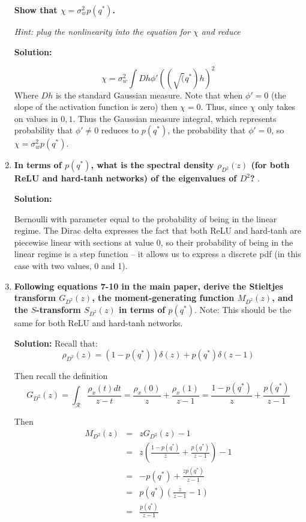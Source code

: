 \documentclass[a4paper]{article}
\begin{document}
\begin{enumerate}[label=(\alph*)]
\textbf{Show that $\chi = \sigma_w^2 p(q^*)$.}

\textit{Hint: plug the nonlinearity into the equation for $\chi$ and reduce}

\begin{tcolorbox}
\textbf{Solution:}

$$\chi = \sigma_w^2 \int D h \phi ' ((\sqrt(q^*)h)^2$$
Where $D h$ is the standard Gaussian measure. Note that when $\phi' = 0$ (the slope of the activation function is zero) then $\chi=0$. Thus, since $\chi$ only takes on values in ${0,1}$. Thus the Gaussian measure integral, which represents probability that $\phi ' \neq 0$ reduces to $p(q^*)$, the probability that $\phi' = 0$, so $\chi = \sigma_w^2 p(q^*)$.
\end{tcolorbox}

\item \textbf{In terms of $p(q^*)$, what is the spectral density $\rho_{D^2}(z)$ (for both ReLU and hard-tanh networks) of the eigenvalues of $D^2$? }.

\begin{tcolorbox}

\textbf{Solution:}

Bernoulli with parameter equal to the probability of being in the linear regime. The Dirac delta expresses the fact that both ReLU and hard-tanh are piecewise linear with sections at value $0$, so their probability of being in the linear regime is a step function -- it allows us to express a discrete pdf (in this case with two values, 0 and 1).
\end{tcolorbox}


\item \textbf{Following equations 7-10 in the main paper, derive the Stieltjes transform $G_{D^2}(z)$, the moment-generating function  $M_{D^2}(z)$, and the $S$-transform  $S_{D^2}(z)$ in terms of $p(q^*)$}. 
Note: This should be the same for both ReLU and hard-tanh networks.

\begin{tcolorbox}
\textbf{Solution:}
Recall that:
$$ \rho_{D^2} (z) = (1-p(q^*)) \delta (z) + p(q^*) \delta(z-1)$$

Then recall the definition 
$$ G_{D^2} (z) = \int_\mathcal{R} \frac{\rho_x (t) dt}{z-t} = \frac{\rho_x(0)}{z} + \frac{\rho_x (1)}{z-1} = \frac{1-p(q^*)}{z} + \frac{p(q^*)}{z-1}$$

Then 
\begin{eqnarray*}
M_{D^2}(z) &=& z G_{D^2}(z) - 1 \\
&=& z \left(\frac{1-p(q^*)}{z} + \frac{p(q^*)}{z-1}\right) - 1 \\
&=&  -p(q^*) + \frac{z p(q^*)}{z-1} \\
&=& p(q^*) \left(\frac{z}{z-1} - 1\right) \\
&=& \frac{p(q^*)}{{z-1}}
\end{eqnarray*}


\end{tcolorbox}
\end{enumerate}
\end{document}
